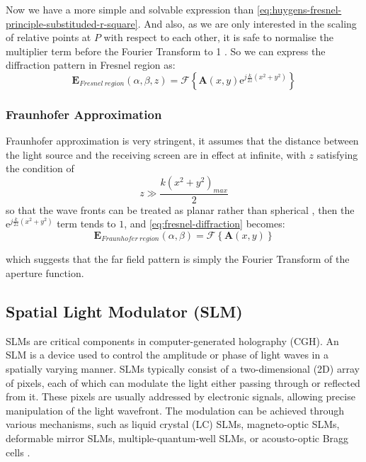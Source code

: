 Now we have a more simple and solvable expression than \cref{eq:huygens-fresnel-principle-substituded-r-square}. And also, as we are only interested in the scaling of relative points at $P$ with respect to each other, it is safe to normalise the multiplier term before the Fourier Transform to 1 \cite{Wilkinson2019}. So we can express the diffraction pattern in Fresnel region as:
\begin{equation}
  \textbf{E}_{Fresnel\ region}(\alpha, \beta, z) = \mathcal{F} \left\{\textbf{A}(x,y)\mathrm{e}^{j\frac{k}{2z}(x^2+y^2)}\right\}
  \label{eq:fresnel-diffraction}
\end{equation}


\subsubsection{Fraunhofer Approximation}
Fraunhofer approximation is very stringent, it assumes that the distance between the light source and the receiving screen are in effect at infinite, with $z$ satisfying the condition of
\begin{equation}
  z\gg \frac{k(x^2+y^2)_{max}}{2}
\end{equation}
so that the wave fronts can be treated as planar rather than spherical \cite{Daintith2009}, then the $\mathrm{e}^{j\frac{k}{2z}(x^2+y^2)}$ term tends to $1$, and \cref{eq:fresnel-diffraction} becomes:
\begin{equation}
  \textbf{E}_{Fraunhofer\ region}(\alpha, \beta) = \mathcal{F} \left\{\textbf{A}(x,y)\right\}
  \label{eq:fraunhofer-diffraction}
\end{equation}

which suggests that the far field pattern is simply the Fourier Transform of the aperture function.


\subsection{Spatial Light Modulator (SLM)} \label{sec:SLM}
SLMs are critical components in computer-generated holography (CGH). An SLM is a device used to control the amplitude or phase of light waves in a spatially varying manner. SLMs typically consist of a two-dimensional (2D) array of pixels, each of which can modulate the light either passing through or reflected from it. These pixels are usually addressed by electronic signals, allowing precise manipulation of the light wavefront. The modulation can be achieved through various mechanisms, such as liquid crystal (LC) SLMs, magneto-optic SLMs, deformable mirror SLMs, multiple-quantum-well SLMs, or acousto-optic Bragg cells \cite{Goodman2017}.


